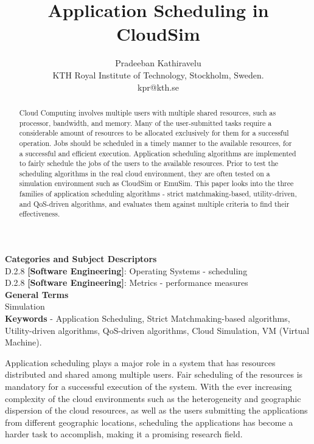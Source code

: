 \documentclass[times, 10pt,twocolumn]{article}
\begin{document}
\title{Application Scheduling in CloudSim}

\author{Pradeeban Kathiravelu\\
KTH Royal Institute of Technology, Stockholm, Sweden.\\ kpr@kth.se\\
}

\maketitle
\thispagestyle{empty}

\begin{abstract}
   Cloud Computing involves multiple users with multiple shared resources, such as processor, bandwidth, and memory. Many of the user-submitted tasks require a considerable amount of resources to be allocated exclusively for them for a successful operation. Jobs should be scheduled in a timely manner to the available resources, for a successful and efficient execution. Application scheduling algorithms are implemented to fairly schedule the jobs of the users to the available resources. Prior to test the scheduling algorithms in the real cloud environment, they are often tested on a simulation environment such as CloudSim or EmuSim. This paper looks into the three families of application scheduling algorithms -  strict matchmaking-based, utility-driven, and QoS-driven algorithms, and evaluates them against multiple criteria to find their effectiveness. 
\end{abstract}


\textbf{Categories and Subject Descriptors}\\
D.2.8 \textbf{[Software Engineering]}: Operating Systems - scheduling\\
D.2.8 \textbf{[Software Engineering]}: Metrics - performance measures\\
\textbf{General Terms}\\
Simulation\\
\textbf{Keywords} -  Application Scheduling, Strict Matchmaking-based algorithms, Utility-driven algorithms, QoS-driven algorithms, Cloud Simulation, VM (Virtual Machine).


Application scheduling plays a major role in a system that has resources distributed and shared among multiple users. Fair scheduling of the resources is mandatory for a successful execution of the system. With the ever increasing complexity of the cloud environments such as the heterogeneity and geographic dispersion of the cloud resources, as well as the users submitting the applications from different geographic locations, scheduling the applications has become a harder task to accomplish, making it a promising research field.
\end{document}
